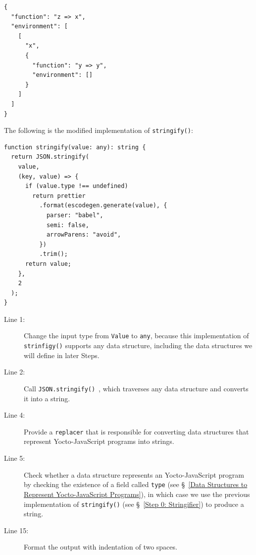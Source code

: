 \documentclass[12pt, oneside]{book}
\begin{document}
\begin{verbatim}
{
  "function": "z => x",
  "environment": [
    [
      "x",
      {
        "function": "y => y",
        "environment": []
      }
    ]
  ]
}
\end{verbatim}

The following is the modified implementation of \texttt{stringify()}:

\begin{verbatim}
function stringify(value: any): string {
  return JSON.stringify(
    value,
    (key, value) => {
      if (value.type !== undefined)
        return prettier
          .format(escodegen.generate(value), {
            parser: "babel",
            semi: false,
            arrowParens: "avoid",
          })
          .trim();
      return value;
    },
    2
  );
}
\end{verbatim}

\begin{description}
\item [Line 1:]

Change the input type from \texttt{Value} to \texttt{any}, because this implementation of \texttt{strinfigy()} supports any data structure, including the data structures we will define in later Steps.

\item [Line 2:]

Call \texttt{JSON.stringify()}~\cite{javascript-json-stringify}, which traverses any data structure and converts it into a string.

\item [Line 4:]

Provide a \texttt{replacer} that is responsible for converting data structures that represent Yocto-JavaScript programs into strings.

\item [Line 5:]

Check whether a data structure represents an Yocto-JavaScript program by checking the existence of a field called \texttt{type} (see §~\ref{Data Structures to Represent Yocto-JavaScript Programs}), in which case we use the previous implementation of \texttt{stringify()} (see §~\ref{Step 0: Stringifier}) to produce a string.

\item [Line 15:]

Format the output with indentation of two spaces.
\end{description}
\end{document}
